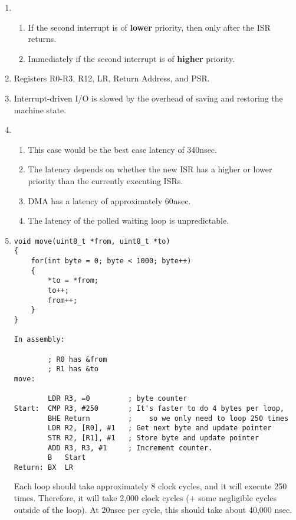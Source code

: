 \documentclass{article}
\begin{document}
\begin{enumerate}
    \item 
        \begin{enumerate}
            \item If the second interrupt is of \textbf{lower} priority, then only after the ISR returns.
            \item Immediately if the second interrupt is of \textbf{higher} priority.
        \end{enumerate}
    \item Registers R0-R3, R12, LR, Return Address, and PSR. 
    \item Interrupt-driven I/O is slowed by the overhead of saving and restoring the machine state.
    \item 
        \begin{enumerate}
            \item This case would be the best case latency of 340nsec.
            \item The latency depends on whether the new ISR has a higher or lower priority than the currently executing ISRs.
            \item DMA has a latency of approximately 60nsec.
            \item The latency of the polled waiting loop is unpredictable.
        \end{enumerate}
    \item 
\begin{lstlisting}
void move(uint8_t *from, uint8_t *to)
{
    for(int byte = 0; byte < 1000; byte++)
    { 
        *to = *from;
        to++; 
        from++;
    }
}
   
In assembly:

        ; R0 has &from
        ; R1 has &to
move:

        LDR R3, =0         ; byte counter
Start:  CMP R3, #250       ; It's faster to do 4 bytes per loop,
        BHE Return         ;    so we only need to loop 250 times
        LDR R2, [R0], #1   ; Get next byte and update pointer
        STR R2, [R1], #1   ; Store byte and update pointer
        ADD R3, R3, #1     ; Increment counter.
        B   Start
Return: BX  LR
\end{lstlisting}

    Each loop should take approximately 8 clock cycles, and it will execute
250 times. Therefore, it will take 2,000 clock cycles (+ some negligible
cycles outside of the loop). At 20nsec per cycle, this should take about
40,000 nsec.
\end{enumerate}
\end{document}
